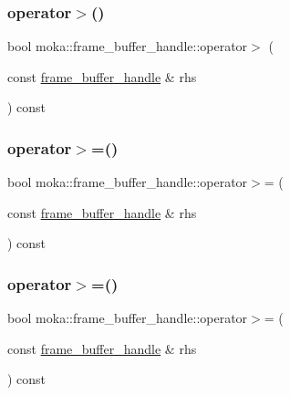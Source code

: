 \mbox{\label{structmoka_1_1frame__buffer__handle_a8d3069ff959b4df8113a6047de9a587f}} 
\subsubsection{\texorpdfstring{operator$>$()}{operator>()}\hspace{0.1cm}{\footnotesize\ttfamily [2/2]}}
{\footnotesize\ttfamily bool moka\+::frame\+\_\+buffer\+\_\+handle\+::operator$>$ (\begin{DoxyParamCaption}\item[{const \mbox{\hyperlink{structmoka_1_1frame__buffer__handle}{frame\+\_\+buffer\+\_\+handle}} \&}]{rhs }\end{DoxyParamCaption}) const}

\mbox{\label{structmoka_1_1frame__buffer__handle_a534fb2973b16baa39aa8961f9f9656cb}} 
\subsubsection{\texorpdfstring{operator$>$=()}{operator>=()}\hspace{0.1cm}{\footnotesize\ttfamily [1/2]}}
{\footnotesize\ttfamily bool moka\+::frame\+\_\+buffer\+\_\+handle\+::operator$>$= (\begin{DoxyParamCaption}\item[{const \mbox{\hyperlink{structmoka_1_1frame__buffer__handle}{frame\+\_\+buffer\+\_\+handle}} \&}]{rhs }\end{DoxyParamCaption}) const}

\mbox{\label{structmoka_1_1frame__buffer__handle_a534fb2973b16baa39aa8961f9f9656cb}} 
\subsubsection{\texorpdfstring{operator$>$=()}{operator>=()}\hspace{0.1cm}{\footnotesize\ttfamily [2/2]}}
{\footnotesize\ttfamily bool moka\+::frame\+\_\+buffer\+\_\+handle\+::operator$>$= (\begin{DoxyParamCaption}\item[{const \mbox{\hyperlink{structmoka_1_1frame__buffer__handle}{frame\+\_\+buffer\+\_\+handle}} \&}]{rhs }\end{DoxyParamCaption}) const}



